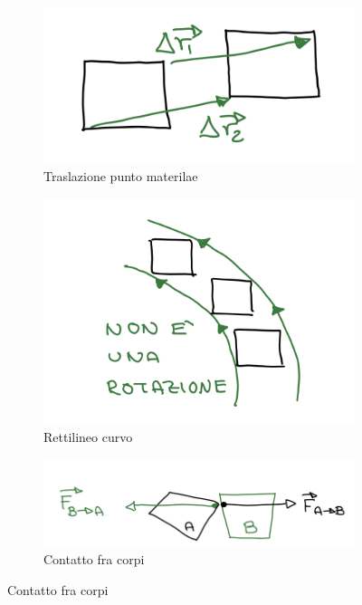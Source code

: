 \begin{figure}[h!]
    \vspace{-10pt}
    \centering
    \begin{subfigure}[b]{0.25\textwidth}
        \centering
        \includegraphics[width=\textwidth]{images/reazioni-vincolari-intro-1.png}
        \caption*{Traslazione punto materilae}
    \end{subfigure}
    \begin{subfigure}[b]{0.25\textwidth}
        \centering
        \includegraphics[width=\textwidth]{images/reazioni-vincolari-intro-2.png}
        \caption*{Rettilineo curvo}
    \end{subfigure}
    \begin{subfigure}[b]{0.4\textwidth}
        \centering
        \includegraphics[width=\textwidth]{images/reazioni-vincolari-intro-3.png}
        \caption*{Contatto fra corpi}
    \end{subfigure}
\end{figure}

